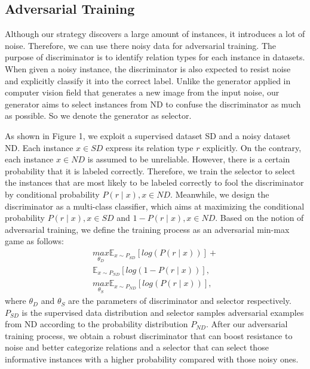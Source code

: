 \documentclass[conference]{IEEEtran}
\begin{document}
\subsection{Adversarial Training}
\label{sect:ad}
Although our strategy discovers a large amount of instances, it introduces a lot of noise.
Therefore, we can use there noisy data for adversarial training.
The purpose of discriminator is to identify relation types for each instance in datasets.
When given a noisy instance, the discriminator is also expected to resist noise and explicitly classify it into the correct label.  
Unlike the generator applied in computer vision field \cite{im2016generating} that generates a new image from the input noise, our generator aims to select instances from ND to confuse the discriminator as much as possible.
So we denote the generator as selector.

As shown in Figure 1, we exploit a supervised dataset SD and a noisy dataset ND.
Each instance $x \in SD$ express its relation type $r$ explicitly.
On the contrary, each instance $x \in ND$ is assumed to be unreliable.
However, there is a certain probability that it is labeled correctly.
Therefore, we train the selector to select the instances that are most likely to be labeled correctly to fool the discriminator by conditional probability $P\left(r\mid x\right), x \in ND$.
Meanwhile, we design the discriminator as a multi-class classifier, which aims at maximizing the conditional probability $P\left(r\mid x\right), x\in SD$ and $1-P\left(r\mid x\right), x\in ND$.
Based on the notion of adversarial training, we define the training process as an adversarial min-max game as follows: 
\begin{equation}
\begin{aligned}
  \underset{\theta_{D}}{max }\mathbb{E}_{x\sim P_{SD}}\left [ log\left ( P\left ( r\mid x \right ) \right ) \right ]+ \\
  \mathbb{E}_{x\sim P_{ND}}\left [log\left ( 1-P\left ( r\mid x \right ) \right ) \right ], \\
  \underset{\theta_{S}}{max }\mathbb{E}_{x\sim P_{ND}}\left [ log\left ( P\left ( r\mid x \right ) \right ) \right ],
\end{aligned}
\end{equation}
where $\theta_{D}$ and $\theta_{S}$ are the parameters of discriminator and selector respectively.
$P_{SD}$ is the supervised data distribution and selector samples adversarial examples from ND according to the probability distribution $P_{ND}$.
After our adversarial training process, we obtain a robust discriminator that can boost resistance to noise and better categorize relations and a selector that can select those informative instances with a higher probability compared with those noisy ones.
\end{document}
